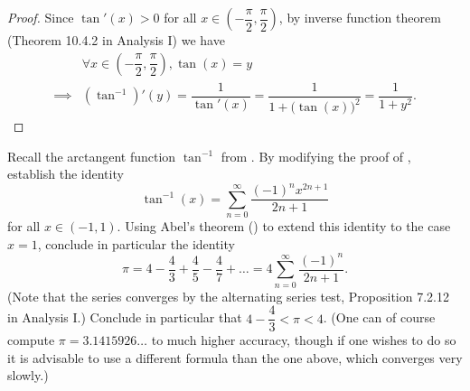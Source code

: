 \begin{proof}
  Since \(\tan'(x) > 0\) for all \(x \in (-\dfrac{\pi}{2}, \dfrac{\pi}{2})\), by inverse function theorem (Theorem 10.4.2 in Analysis I) we have
  \begin{align*}
             & \forall x \in (-\dfrac{\pi}{2}, \dfrac{\pi}{2}), \tan(x) = y                                     \\
    \implies & (\tan^{-1})'(y) = \dfrac{1}{\tan'(x)} = \dfrac{1}{1 + \big(\tan(x)\big)^2} = \dfrac{1}{1 + y^2}.
  \end{align*}
\end{proof}

\begin{ex}\label{ii:ex:4.7.9}
  Recall the arctangent function \(\tan^{-1}\) from .
  By modifying the proof of , establish the identity
  \[
    \tan^{-1}(x) = \sum_{n = 0}^\infty \dfrac{(-1)^n x^{2n + 1}}{2n + 1}
  \]
  for all \(x \in (-1, 1)\).
  Using Abel's theorem () to extend this identity to the case \(x = 1\), conclude in particular the identity
  \[
    \pi = 4 - \dfrac{4}{3} + \dfrac{4}{5} - \dfrac{4}{7} + \dots = 4 \sum_{n = 0}^\infty \dfrac{(-1)^n}{2n + 1}.
  \]
  (Note that the series converges by the alternating series test, Proposition 7.2.12 in Analysis I.)
  Conclude in particular that \(4 - \dfrac{4}{3} < \pi < 4\).
  (One can of course compute \(\pi = 3.1415926 \dots\) to much higher accuracy, though if one wishes to do so it is advisable to use a different formula than the one above, which converges very slowly.)
\end{ex}

